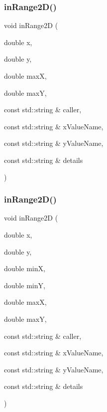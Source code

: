 \subsubsection{\texorpdfstring{in\+Range2\+D()}{inRange2D()}\hspace{0.1cm}{\footnotesize\ttfamily [1/4]}}
{\footnotesize\ttfamily void in\+Range2D (\begin{DoxyParamCaption}\item[{double}]{x,  }\item[{double}]{y,  }\item[{double}]{maxX,  }\item[{double}]{maxY,  }\item[{const std\+::string \&}]{caller,  }\item[{const std\+::string \&}]{x\+Value\+Name,  }\item[{const std\+::string \&}]{y\+Value\+Name,  }\item[{const std\+::string \&}]{details }\end{DoxyParamCaption})}

\mbox{\label{namespacerequire_a9b881272950994dad8e16dde47c99f08}} 
\subsubsection{\texorpdfstring{in\+Range2\+D()}{inRange2D()}\hspace{0.1cm}{\footnotesize\ttfamily [2/4]}}
{\footnotesize\ttfamily void in\+Range2D (\begin{DoxyParamCaption}\item[{double}]{x,  }\item[{double}]{y,  }\item[{double}]{minX,  }\item[{double}]{minY,  }\item[{double}]{maxX,  }\item[{double}]{maxY,  }\item[{const std\+::string \&}]{caller,  }\item[{const std\+::string \&}]{x\+Value\+Name,  }\item[{const std\+::string \&}]{y\+Value\+Name,  }\item[{const std\+::string \&}]{details }\end{DoxyParamCaption})}

\mbox{\label{namespacerequire_a2955ad574e8a2ec60b21c34409332b5c}} 
